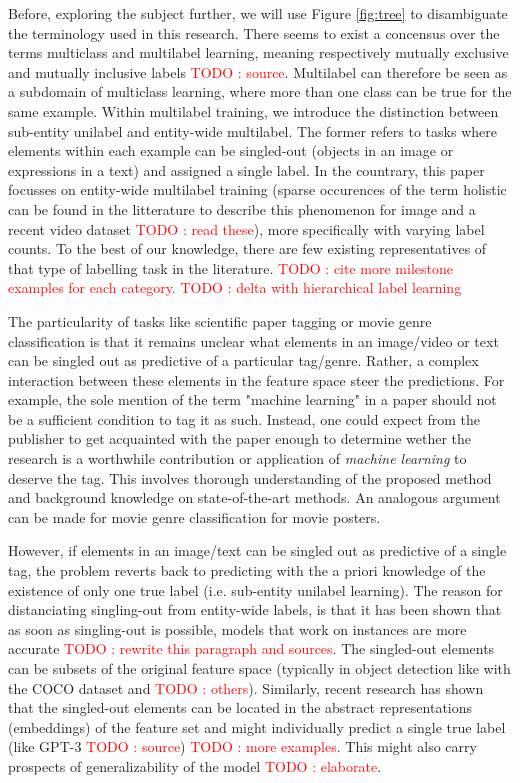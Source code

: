 \documentclass[sigconf,natbib,screen=true,review=true,anonymous]{acmart}
\newcommand\todo[1]{\textcolor{red}{TODO : #1}}
\begin{document}
Before, exploring the subject further, we will use Figure \ref{fig:tree} to disambiguate the terminology used in this research. There seems to exist a concensus over the terms multiclass and multilabel learning, meaning respectively mutually exclusive and mutually inclusive labels \todo{source}. Multilabel can therefore be seen as a subdomain of multiclass learning, where more than one class can be true for the same example. Within multilabel training, we introduce the distinction between sub-entity unilabel and entity-wide multilabel. The former refers to tasks where elements within each example can be singled-out (objects in an image or expressions in a text) and assigned a single label. In the countrary, this paper focusses on entity-wide multilabel training (sparse occurences of the term holistic can be found in the litterature to describe this phenomenon for image \cite{holisticImageDescriptors,holisticLungs} and a recent video dataset \cite{holisticVideoData} \todo{read these}), more specifically with varying label counts. To the best of our knowledge, there are few existing representatives of that type of labelling task in the literature. \todo{cite more milestone examples for each category.} \todo{delta with hierarchical label learning}

The particularity of tasks like scientific paper tagging or movie genre classification is that it remains unclear what elements in an image/video or text can be singled out as predictive of a particular tag/genre. Rather, a complex interaction between these elements in the feature space steer the predictions. For example, the sole mention of the term "machine learning" in a paper should not be a sufficient condition to tag it as such. Instead, one could expect from the publisher to get acquainted with the paper enough to determine wether the research is a worthwhile contribution or application of \emph{machine learning} to deserve the tag. This involves thorough understanding of the proposed method and background knowledge on state-of-the-art methods. An analogous argument can be made for movie genre classification for movie posters.

However, if elements in an image/text can be singled out as predictive of a single tag, the problem reverts back to predicting with the a priori knowledge of the existence of only one true label (i.e. sub-entity unilabel learning).  The reason for distanciating singling-out from entity-wide labels, is that it has been shown that as soon as singling-out is possible, models that work on instances are more accurate \todo{rewrite this paragraph and sources}. The singled-out elements can be subsets of the original feature space (typically in object detection like with the COCO dataset  \cite{COCO} and \todo{others}). Similarly, recent research has shown that the singled-out elements can be located in the abstract representations (embeddings) of the feature set and might individually predict a single true label (like GPT-3 \todo{source}) \todo{more examples}. This might also carry prospects of generalizability of the model \cite{generalization} \todo{elaborate}. 
\end{document}
